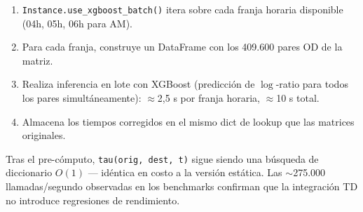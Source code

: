 \begin{enumerate}
    \item \texttt{Instance.use\_xgboost\_batch()} itera sobre cada franja horaria disponible (04h, 05h, 06h para AM).
    \item Para cada franja, construye un DataFrame con los 409.600 pares OD de la matriz.
    \item Realiza inferencia en lote con XGBoost (predicción de $\log$-ratio para todos los pares simultáneamente): $\approx$2,5 s por franja horaria, $\approx$10 s total.
    \item Almacena los tiempos corregidos en el mismo dict de lookup que las matrices originales.
\end{enumerate}

Tras el pre-cómputo, \texttt{tau(orig, dest, t)} sigue siendo una búsqueda de diccionario $O(1)$ — idéntica en costo a la versión estática. Las $\sim$275.000 llamadas/segundo observadas en los benchmarks confirman que la integración TD no introduce regresiones de rendimiento.
